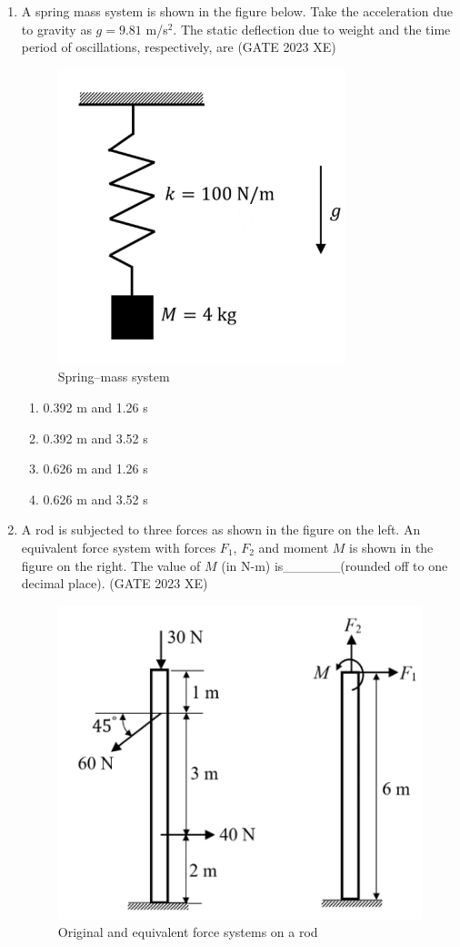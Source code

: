 \documentclass[journal,12pt,onecolumn]{IEEEtran}
\begin{document}
\begin{enumerate}
\newpage

\item A spring mass system is shown in the figure below. Take the acceleration due to
gravity as $g=9.81$ m/s$^2$. The static deflection due to weight and the time period of
oscillations, respectively, are
\hfill{(GATE 2023 XE)}

\begin{figure}[htbp]
\centering
\includegraphics[width=0.4\columnwidth]{figs/C/fig5.png}
\caption{Spring–mass system}
\label{fig:figs/C/fig5.png}
\end{figure}

\begin{multicols}{2}
\begin{enumerate}
\item 0.392 m and 1.26 s
\item 0.392 m and 3.52 s
\item 0.626 m and 1.26 s
\item 0.626 m and 3.52 s
\end{enumerate}
\end{multicols}

\item A rod is subjected to three forces as shown in the figure on the left. An equivalent
force system with forces $F_1$, $F_2$ and moment $M$ is shown in the figure on the
right. The value of $M$ (in N-m) is\_\_\_\_\_\_(rounded off to one decimal place).
\hfill{(GATE 2023 XE)}

\begin{figure}[htbp]
\centering
\includegraphics[width=0.4\columnwidth]{figs/C/fig6.png}
\caption{Original and equivalent force systems on a rod}
\label{fig:figs/C/fig6.png}
\end{figure}


\end{enumerate}
\end{document}
